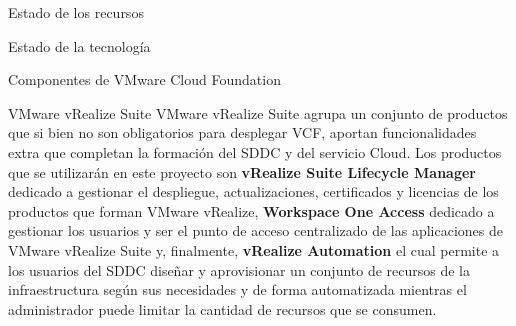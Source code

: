 \begin{chapter}{Estado de los recursos}
\begin{section}{Estado de la tecnología}
\begin{subsection}{Componentes de VMware Cloud Foundation}
\begin{subsubsection}{VMware vRealize Suite}
    VMware vRealize Suite agrupa un conjunto de productos que si bien no son obligatorios para desplegar VCF, aportan funcionalidades extra que completan la formación del SDDC y del servicio Cloud. Los productos que se utilizarán en este proyecto son \textbf{vRealize Suite Lifecycle Manager} dedicado a gestionar el despliegue, actualizaciones, certificados y licencias de los productos que forman VMware vRealize, \textbf{Workspace One Access} dedicado a gestionar los usuarios y ser el punto de acceso centralizado de las aplicaciones de VMware vRealize Suite y, finalmente, \textbf{vRealize Automation} el cual permite a los usuarios del SDDC diseñar y aprovisionar un conjunto de recursos de la infraestructura según sus necesidades y de forma automatizada mientras el administrador puede limitar la cantidad de recursos que se consumen.
\end{subsubsection}

\end{subsection}

\end{section}

\end{chapter}